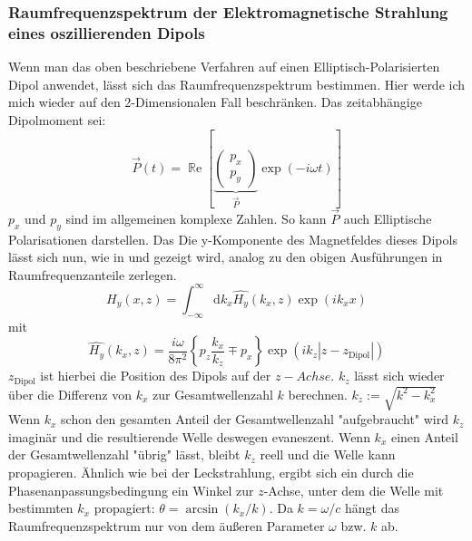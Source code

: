 \documentclass{article}
\begin{document}
	\subsubsection{Raumfrequenzspektrum der Elektromagnetische Strahlung eines oszillierenden Dipols}
		Wenn man das oben beschriebene Verfahren auf einen Elliptisch-Polarisierten Dipol anwendet, lässt sich das Raumfrequenzspektrum bestimmen. Hier werde ich mich wieder auf den 2-Dimensionalen Fall beschränken. Das zeitabhängige Dipolmoment sei: 
		$$\vec{P}(t)= \operatorname{\mathbb{R}e}\left[\underbrace{\begin{pmatrix} p_x \\ p_y \end{pmatrix}}_{\vec{P}} \exp(-i\omega t)\right]$$
		$p_x$ und $p_y$ sind im allgemeinen komplexe Zahlen. So kann $\vec{P}$ auch Elliptische Polarisationen darstellen. Das Die y-Komponente des Magnetfeldes dieses Dipols lässt sich nun, wie in \cite{Novotny.2012b} und \cite{RodriguezFortuno.2013} gezeigt wird, analog zu den obigen Ausführungen in Raumfrequenzanteile zerlegen.
		\begin{equation}
			H_y(x, z) = \int_{-\infty}^{\infty}\mathrm{d}k_x\hat{H_y}(k_x, z)\exp(ik _xx) 
		\end{equation}
		mit
		\begin{equation}
			\boxed{\hat{H_y}(k_x, z) = \dfrac{i\omega}{8\pi^2}\left\{p_z\dfrac{k_x}{k_z} \mp p_x\right\}\exp(ik_z|z-z_{\mathrm{Dipol}}|)}
		\end{equation}
	$z_{\mathrm{Dipol}}$ ist hierbei die Position des Dipols auf der $z-Achse$. $k_z$ lässt sich wieder über die Differenz von $k_x$ zur Gesamtwellenzahl $k$ berechnen. $k_z := \sqrt{k^2-k_x^2}$ Wenn $k_x$ schon den gesamten Anteil der Gesamtwellenzahl "aufgebraucht" wird $k_z$ imaginär und die resultierende Welle deswegen evaneszent. Wenn $k_x$ einen Anteil der Gesamtwellenzahl "übrig" lässt, bleibt $k_z$ reell und die Welle kann propagieren. Ähnlich wie bei der Leckstrahlung, ergibt sich ein durch die Phasenanpassungsbedingung ein Winkel zur $z$-Achse, unter dem die Welle mit bestimmten $k_x$ propagiert: $\theta = \arcsin(k_x/k)$. Da $k = \omega / c$  hängt das Raumfrequenzspektrum nur von dem äußeren Parameter $\omega$ bzw. $k$ ab. 
\end{document}
